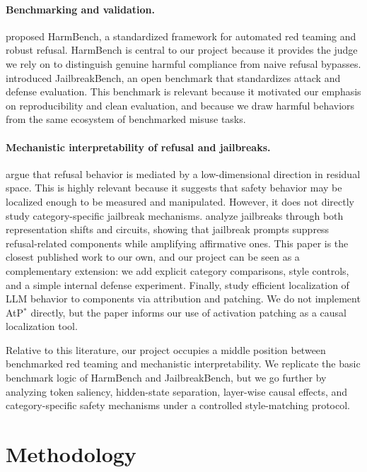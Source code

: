 \documentclass{article}
\begin{document}
\paragraph{Benchmarking and validation.}
\citet{mazeika2024harmbench} proposed HarmBench, a standardized framework for automated red teaming and robust refusal. HarmBench is central to our project because it provides the judge we rely on to distinguish genuine harmful compliance from naive refusal bypasses. \citet{chao2024jailbreakbench} introduced JailbreakBench, an open benchmark that standardizes attack and defense evaluation. This benchmark is relevant because it motivated our emphasis on reproducibility and clean evaluation, and because we draw harmful behaviors from the same ecosystem of benchmarked misuse tasks.

\paragraph{Mechanistic interpretability of refusal and jailbreaks.}
\citet{arditi2024refusal} argue that refusal behavior is mediated by a low-dimensional direction in residual space. This is highly relevant because it suggests that safety behavior may be localized enough to be measured and manipulated. However, it does not directly study category-specific jailbreak mechanisms. \citet{he2024jailbreaklens} analyze jailbreaks through both representation shifts and circuits, showing that jailbreak prompts suppress refusal-related components while amplifying affirmative ones. This paper is the closest published work to our own, and our project can be seen as a complementary extension: we add explicit category comparisons, style controls, and a simple internal defense experiment. Finally, \citet{kramar2024atpstar} study efficient localization of LLM behavior to components via attribution and patching. We do not implement AtP$^\ast$ directly, but the paper informs our use of activation patching as a causal localization tool.

Relative to this literature, our project occupies a middle position between benchmarked red teaming and mechanistic interpretability. We replicate the basic benchmark logic of HarmBench and JailbreakBench, but we go further by analyzing token saliency, hidden-state separation, layer-wise causal effects, and category-specific safety mechanisms under a controlled style-matching protocol.

\section{Methodology}
\end{document}
